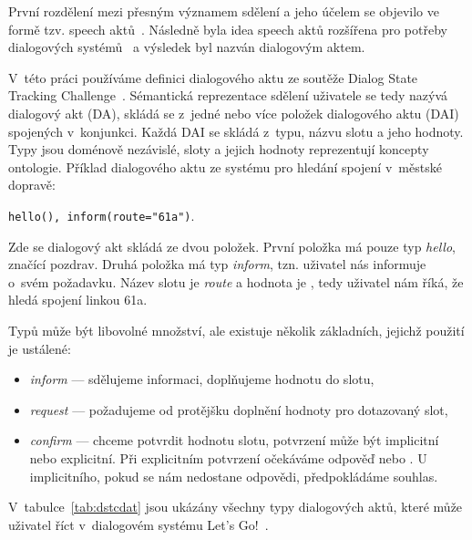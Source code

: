 První rozdělení mezi přesným významem sdělení a jeho účelem se objevilo ve formě tzv. speech aktů~\cite{austin1975things}.
Následně byla idea speech aktů rozšířena pro potřeby dialogových systémů~\cite{traum1999speech} a výsledek byl nazván dialogovým aktem.

V~této práci používáme definici dialogového aktu ze soutěže Dialog State Tracking Challenge~\cite{williamsdialog}.
Sémantická reprezentace sdělení uživatele se tedy nazývá dialogový akt (DA), skládá se z~jedné nebo více položek dialogového aktu (DAI) spojených v~konjunkci.
Každá DAI se skládá z~typu, názvu slotu a jeho hodnoty. 
Typy jsou doménově nezávislé, sloty a jejich hodnoty reprezentují koncepty ontologie.
Příklad dialogového aktu ze systému pro hledání spojení v~městské dopravě:

\begin{center}
{\tt hello(), inform(route="61a")}.
\end{center}

Zde se dialogový akt skládá ze dvou položek.
První položka má pouze typ {\em hello}, značící pozdrav.
Druhá položka má typ {\em inform}, tzn. uživatel nás informuje o~svém požadavku.
Název slotu je {\em route} a hodnota je , tedy uživatel nám říká, že hledá spojení linkou 61a.

Typů může být libovolné množství, ale existuje několik základních, jejichž použití je ustálené:
\begin{itemize}
\item {\em inform} --- sdělujeme informaci, doplňujeme hodnotu do slotu,
\item {\em request} --- požadujeme od protějšku doplnění hodnoty pro dotazovaný slot,
\item {\em confirm} --- chceme potvrdit hodnotu slotu, potvrzení může být implicitní nebo explicitní.
	Při explicitním potvrzení očekáváme odpověď  nebo .
	U implicitního, pokud se nám nedostane odpovědi, předpokládáme souhlas.
\end{itemize}

V~tabulce~\ref{tab:dstcdat} jsou ukázány všechny typy dialogových aktů, které může uživatel říct v~dialogovém systému Let's Go!~\cite{williamsdialog}.

